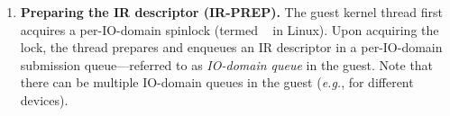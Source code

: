 \begin{enumerate}
\item {\bf Preparing the IR descriptor (IR-PREP).} 
The guest kernel thread first acquires 
    a per-IO-domain 
    spinlock (termed ~\cite{dmar_domain.cache_lock} in Linux). 
    Upon acquiring the lock, the thread prepares and enqueues 
    an IR descriptor in a per-IO-domain submission queue---referred 
    to as {\it IO-domain queue} in the guest. 
Note that there can be multiple IO-domain queues in the guest
    (\textit{e.g.}, for different devices).



\end{enumerate}
